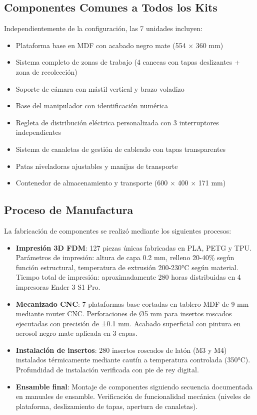 \subsection{Componentes Comunes a Todos los Kits}

Independientemente de la configuración, las 7 unidades incluyen:

\begin{itemize}
    \item Plataforma base en MDF con acabado negro mate (554 × 360 mm)
    \item Sistema completo de zonas de trabajo (4 canecas con tapas deslizantes + zona de recolección)
    \item Soporte de cámara con mástil vertical y brazo voladizo
    \item Base del manipulador con identificación numérica
    \item Regleta de distribución eléctrica personalizada con 3 interruptores independientes
    \item Sistema de canaletas de gestión de cableado con tapas transparentes
    \item Patas niveladoras ajustables y manijas de transporte
    \item Contenedor de almacenamiento y transporte (600 × 400 × 171 mm)
\end{itemize}

\subsection{Proceso de Manufactura}

La fabricación de componentes se realizó mediante los siguientes procesos:

\begin{itemize}
    \item \textbf{Impresión 3D FDM}: 127 piezas únicas fabricadas en PLA, PETG y TPU. Parámetros de impresión: altura de capa 0.2 mm, relleno 20-40\% según función estructural, temperatura de extrusión 200-230°C según material. Tiempo total de impresión: aproximadamente 280 horas distribuidas en 4 impresoras Ender 3 S1 Pro.
    
    \item \textbf{Mecanizado CNC}: 7 plataformas base cortadas en tablero MDF de 9 mm mediante router CNC. Perforaciones de Ø5 mm para insertos roscados ejecutadas con precisión de ±0.1 mm. Acabado superficial con pintura en aerosol negro mate aplicada en 3 capas.
    
    \item \textbf{Instalación de insertos}: 280 insertos roscados de latón (M3 y M4) instalados térmicamente mediante cautín a temperatura controlada (350°C). Profundidad de instalación verificada con pie de rey digital.
    
    \item \textbf{Ensamble final}: Montaje de componentes siguiendo secuencia documentada en manuales de ensamble. Verificación de funcionalidad mecánica (niveles de plataforma, deslizamiento de tapas, apertura de canaletas).
\end{itemize}

